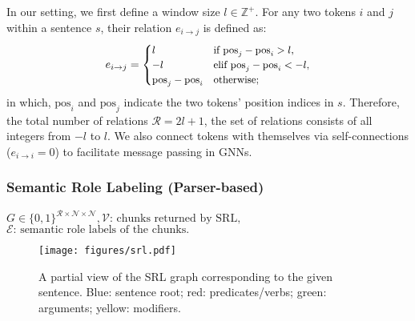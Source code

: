\documentclass[11pt]{article}
\begin{document}
In our setting, we first define a window size $l \in \mathbb{Z}^{+}$. 
For any two tokens $i$ and $j$ within a sentence $s$, their relation $e_{i \rightarrow j}$ is defined as:
\begin{equation}
\small
e_{i \rightarrow j} = 
    \begin{cases}
        l  & \text{if $\text{pos}_j - \text{pos}_i > l$,}\\
        -l & \text{elif $\text{pos}_j - \text{pos}_i < -l$,}\\
        \text{pos}_j - \text{pos}_i & \text{otherwise;}
    \end{cases}
\end{equation}
in which, $\text{pos}_i$ and $\text{pos}_j$ indicate the two tokens' position indices in $s$.
Therefore, the total number of relations $\mathcal{R} = 2l + 1$, the set of relations consists of all integers from $-l$ to $l$.
We also connect tokens with themselves via self-connections ($e_{i \rightarrow i} = 0$) to facilitate message passing in GNNs.

\subsubsection{Semantic Role Labeling \textbf{\small{(Parser-based)}}}
\label{subsection:srl}
\begin{center}
    \textcolor{blue1}{\textbf{\small{$G \in \{0, 1\}^{\mathcal{R} \times \mathcal{N} \times \mathcal{N}}, \mathcal{V}\text{: chunks returned by SRL},$}}}\\
    \textcolor{blue1}{\textbf{\small{$\mathcal{E}\text{: semantic role labels of the chunks.}$}}}    
\end{center}


\begin{figure}[t!]
    \centering
    \texttt{[image: figures/srl.pdf]}
    \caption{A partial view of the SRL graph corresponding to the given sentence. \textcolor{blue1}{Blue}: sentence root; \textcolor{red1}{red}: predicates/verbs; \textcolor{green1}{green}: arguments; \textcolor{yellow1}{yellow}: modifiers. }
    \label{fig:srl}
\end{figure}
\end{document}
